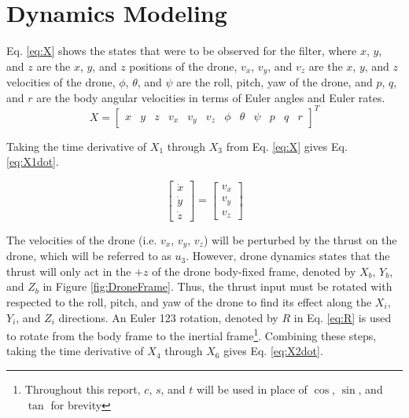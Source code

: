 \documentclass[letterpaper, preprint, paper,11pt]{AAS}	%
\begin{document}
\section{Dynamics Modeling}

Eq. \eqref{eq:X} shows the states that were to be observed for the filter, where $x$, $y$, and $z$ are the $x$, $y$, and $z$ positions of the drone, $v_x$, $v_y$, and $v_z$ are the $x$, $y$, and $z$ velocities of the drone, $\phi$, $\theta$, and $\psi$ are the roll, pitch, yaw of the drone, and $p$, $q$, and $r$ are the body angular velocities in terms of Euler angles and Euler rates. 
\setcounter{MaxMatrixCols}{12}
\begin{equation}
	\label{eq:X}
	X = \begin{bmatrix}
		x & y & z & v_x & v_y & v_z & \phi & \theta & \psi & p & q & r
\end{bmatrix}^T
\end{equation}

Taking the time derivative of $X_1$ through $X_3$ from Eq. \eqref{eq:X} gives Eq. \eqref{eq:X1dot}.

\begin{equation}
\begin{bmatrix}
\dot{x}\\
\dot{y}\\
\dot{z}
\end{bmatrix} =
\begin{bmatrix}
v_x \\
v_y\\
v_z
\end{bmatrix}
\label{eq:X1dot}
\end{equation}

The velocities of the drone (i.e. $v_x$, $v_y$, $v_z$) will be perturbed by the thrust on the drone, which will be referred to as $u_3$. However, drone dynamics states that the thrust will only act in the $+z$ of the drone body-fixed frame, denoted by $X_b$, $Y_b$, and $Z_b$ in Figure \ref{fig:DroneFrame}. Thus, the thrust input must be rotated with respected to the roll, pitch, and yaw of the drone to find its effect along the $X_i$, $Y_i$, and $Z_i$ directions. An Euler 123 rotation, denoted by $R$ in Eq. \eqref{eq:R} is used to rotate from the body frame to the inertial frame\footnote{Throughout this report, $c$, $s$, and $t$ will be used in place of $\cos$, $\sin$, and $\tan$ for brevity}. Combining these steps, taking the time derivative of $X_4$ through $X_6$ gives Eq. \eqref{eq:X2dot}.
\end{document}
